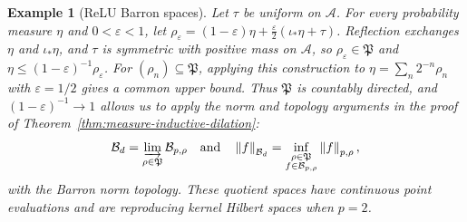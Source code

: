 \documentclass[11pt,leqno]{amsart}
\theoremstyle{compact}
\numberwithin{equation}{section}
\theoremstyle{compactremark}
\newtheorem{example}[theorem]{Example}
\theoremstyle{compact}
\newcommand{\1}{\mathbbm{1}}
\newcommand{\norm}[1]{\left\|#1\right\|}
\begin{document}
\begin{example}[ReLU Barron spaces]
Let $\tau$ be uniform on $\mathcal A$. For every probability measure $\eta$ and $0<\varepsilon<1$, let $ \rho_\varepsilon=(1-\varepsilon)\eta+\frac{\varepsilon}{2}(\iota_*\eta+\tau) $. Reflection exchanges $\eta$ and $\iota_*\eta$, and $\tau$ is symmetric with positive mass on $\mathcal A$, so $\rho_\varepsilon\in\mathfrak P$ and $\eta\leq(1-\varepsilon)^{-1}\rho_\varepsilon$. For $(\rho_n)\subseteq\mathfrak P$, applying this construction to $\eta=\sum_n2^{-n}\rho_n$ with $\varepsilon=1/2$ gives a common upper bound. Thus $\mathfrak P$ is countably directed, and $(1-\varepsilon)^{-1}\to1$ allows us to apply the norm and topology arguments in the proof of Theorem~\ref{thm:measure-inductive-dilation}:
\[
\mathcal B_d=\varinjlim_{\rho\in\mathfrak P}\mathcal B_{p,\rho}\quad\text{and}\quad
\norm{f}_{\mathcal B_d}=\inf_{\substack{\rho\in\mathfrak P\\f\in\mathcal B_{p,\rho}}}\norm{f}_{p,\rho},
\]
with the Barron norm topology. These quotient spaces have continuous point evaluations and are reproducing kernel Hilbert spaces when $p=2$.


\end{example}
\end{document}
